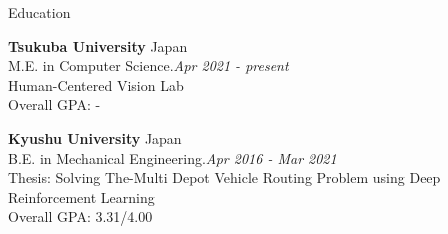 \documentclass{resume} %
\begin{document}
\begin{rSection}{Education}

{\bf Tsukuba University} \hfill {Japan} 
\\ M.E. in Computer Science.\hfill {\em Apr 2021 - present}
\\ Human-Centered Vision Lab
\\ Overall GPA: -

{\bf Kyushu University} \hfill {Japan} 
\\ B.E. in Mechanical Engineering.\hfill {\em Apr 2016 - Mar 2021}
\\ Thesis: Solving The-Multi Depot Vehicle Routing Problem using Deep Reinforcement Learning
\\ Overall GPA: 3.31/4.00


\end{rSection}




\end{document}
